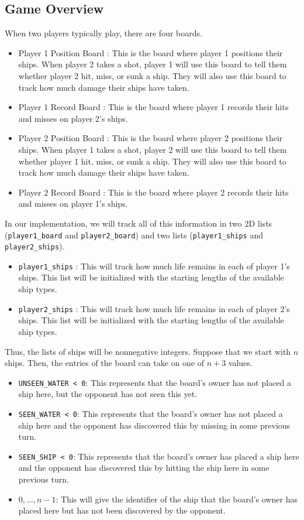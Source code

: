 \documentclass{article}
\begin{document}
\subsection*{Game Overview}
When two players typically play, there are four boards.
\begin{itemize}
    \item Player 1 Position Board : This is the board where player 1 positions their ships. When player 2 takes a shot, player 1 will use this board to tell them whether player 2 hit, miss, or sunk a ship. They will also use this board to track how much damage their ships have taken.
    \item Player 1 Record Board : This is the board where player 1 records their hits and misses on player 2's ships.
    \item Player 2 Position Board : This is the board where player 2 positions their ships. When player 1 takes a shot, player 2 will use this board to tell them whether player 1 hit, miss, or sunk a ship. They will also use this board to track how much damage their ships have taken.
    \item Player 2 Record Board : This is the board where player 2 records their hits and misses on player 1's ships.
\end{itemize}
In our implementation, we will track all of this information in two 2D lists (\texttt{player1\_board} and \texttt{player2\_board}) and two lists (\texttt{player1\_ships} and \texttt{player2\_ships}).
\begin{itemize}
    \item \texttt{player1\_ships} : This will track how much life remains in each of player 1's ships. This list will be initialized with the starting lengths of the available ship types.  
    \item \texttt{player2\_ships} : This will track how much life remains in each of player 2's ships. This list will be initialized with the starting lengths of the available ship types.  
\end{itemize}
Thus, the lists of ships will be nonnegative integers.
\newpage
\noindent Suppose that we start with $n$ ships. Then, the entries of the board can take on one of $n+3$ values.
\begin{itemize}
    \item \texttt{UNSEEN\_WATER < 0}: This represents that the board's owner has not placed a ship here, but the opponent has not seen this yet. 
    \item \texttt{SEEN\_WATER < 0}: This represents that the board's owner has not placed a ship here and the opponent has discovered this by missing in some previous turn.
    \item \texttt{SEEN\_SHIP < 0}: This represents that the board's owner has placed a ship here and the opponent has discovered this by hitting the ship here in some previous turn.
    \item $0,\dots,n-1$: This will give the identifier of the ship that the board's owner has placed here but has not been discovered by the opponent. 
\end{itemize}
\end{document}
